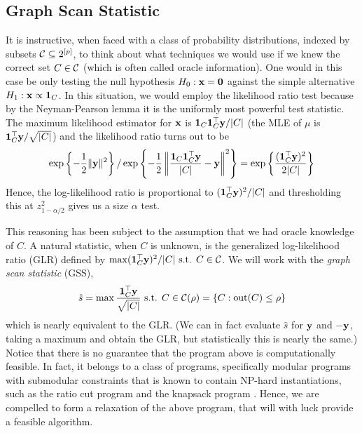 \subsection{Graph Scan Statistic}
\label{sec:graph_scan}
\vspace{-.1cm}
It is instructive, when faced with a class of probability distributions, indexed by subsets $\mathcal{C} \subseteq 2^{[p]}$, to think about what techniques we would use if we knew the correct set $C \in \mathcal{C}$ (which is often called oracle information).
One would in this case be only testing the null hypothesis $H_0: \mathbf{x} = {\bf 0}$ against the simple alternative $H_1: \mathbf{x} \propto {\bf 1}_C$.
In this situation, we would employ the likelihood ratio test because by the Neyman-Pearson lemma it is the uniformly most powerful test statistic.
The maximum likelihood estimator for $\mathbf{x}$ is ${\bf 1}_C {\bf 1}_C^\top \mathbf{y} / |C|$ (the MLE of $\mu$ is ${\bf 1}_C^\top \mathbf{y} /\sqrt{|C|}$) and the likelihood ratio turns out to be 
\[
\exp \left\{ - \frac 12 \| \mathbf{y} \|^2 \right\} / \exp \left\{ - \frac 12 \left\| \frac{{\bf 1}_C {\bf 1}_C^\top \mathbf{y}}{|C|} - \mathbf{y} \right\|^2 \right\} = \exp\left\{ \frac{({\bf 1}_C^\top \mathbf{y})^2}{2|C|} \right\}
\]
Hence, the log-likelihood ratio is proportional to $({\bf 1}_C^\top \mathbf{y})^2/|C|$ and thresholding this at $z^2_{1 - \alpha/2}$ gives us a size $\alpha$ test.

This reasoning has been subject to the assumption that we had oracle knowledge of $C$.
A natural statistic, when $C$ is unknown, is the generalized log-likelihood ratio (GLR) defined by $\max ({\bf 1}_C^\top \mathbf{y})^2/|C| \textrm{ s.t. } C \in \mathcal{C}$.
We will work with the {\em graph scan statistic} (GSS),
\begin{equation}
\label{eq:gss}
\hat s = \max \frac{{\bf 1}_C^\top \mathbf{y}}{\sqrt{|C|}} \textrm{ s.t. } C \in \mathcal{C}(\rho) = \{ C : \textrm{out}(C) \le \rho \}
\end{equation}
which is nearly equivalent to the GLR. (We can in fact evaluate $\hat s$ for $\mathbf{y}$ and $-\mathbf{y}$, taking a maximum and obtain the GLR, but statistically this is nearly the same.)
Notice that there is no guarantee that the program above is computationally feasible.
In fact, it belongs to a class of programs, specifically modular programs with submodular constraints that is known to contain NP-hard instantiations, such as the ratio cut program and the knapsack program \cite{papadimitriou1998combinatorial}.
Hence, we are compelled to form a relaxation of the above program, that will with luck provide a feasible algorithm.
\vspace{-.1cm}
